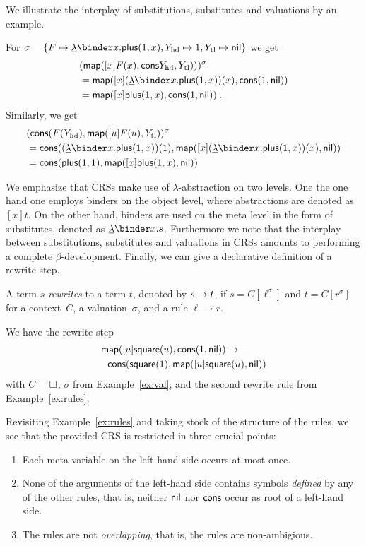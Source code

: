 We illustrate the interplay of substitutions, substitutes and
valuations by an example.
%
\begin{example} \label{ex:val}
  For
  $ \sigma = \{ {F \mapsto \ULAM x. \plus(1,x)}, {\Yhd \mapsto 1},
  {\Ytl \mapsto \nil} \} $
  we get
  \begin{align*}
    & (\map( [x] F(x), \cons{\Yhd}, \Ytl)))^\sigma \\ 
    & =  \map( [x] (\ULAM x . \plus(1,x)) (x), \cons(1, \nil))\\
    & = \map([x] \plus(1,x), \cons(1,\nil))
      \tpkt
  \end{align*}
  Similarly, we get
  \begin{align*}
    & (\cons(F(\Yhd), \map( [u] F(u), \Ytl))^\sigma \\
    & = \cons((\ULAM x . \plus(1,x))(1), 
        \map( [x] (\ULAM x . \plus(1,x)) (x) , \nil))\\
    & = \cons(\plus(1,1), \map([x] \plus(1,x),\nil))
  \end{align*}
\end{example}

We emphasize that CRSs make use of $\lambda$-abstraction on two levels.
One the one hand one employs binders on the object level, where abstractions
are denoted as $[x]t$. On the other hand, binders are used on the meta level
in the form of substitutes, denoted as $\ULAM x . s$. Furthermore we note that
the interplay between substitutions, substitutes and valuations in CRSs amounts
to performing a complete $\beta$-development.
%
Finally, we can give a declarative definition of a rewrite step.
%
\begin{definition}
  A term $s$ \emph{rewrites} to a term $t$, denoted by $s \to t$, if
  $s = C[\ell^\sigma]$ and $t = C[r^\sigma]$ for a context~$C$, a
  valuation~$\sigma$, and a rule $\ell \to r$.
\end{definition}

\begin{example} 
  We have the rewrite step 
  \begin{align*}
    & \mathsf{map}( [u] \mathsf{square}(u), \mathsf{cons}(1,\mathsf{nil})) \to  \\
    &\ \ \mathsf{cons}(\mathsf{square}(1), \mathsf{map}( [u] \mathsf{square}(u), \mathsf{nil})) 
  \end{align*}
  with $C= \square$, $\sigma$ from Example~\ref{ex:val}, and the second
  rewrite rule from Example~\ref{ex:rules}.
\end{example}

Revisiting Example~\ref{ex:rules} and taking stock of the structure
of the rules, we see that the provided CRS is restricted
in three crucial points:
%
\begin{enumerate}
\item Each meta variable on the left-hand side occurs at most once.
\item None of the arguments of the left-hand side contains symbols
\emph{defined} by any of the other rules, that is, neither $\mathsf{nil}$
nor $\mathsf{cons}$ occur as root of a left-hand side.
\item The rules are not \emph{overlapping}, that is, the rules are non-ambigious.
\end{enumerate}

